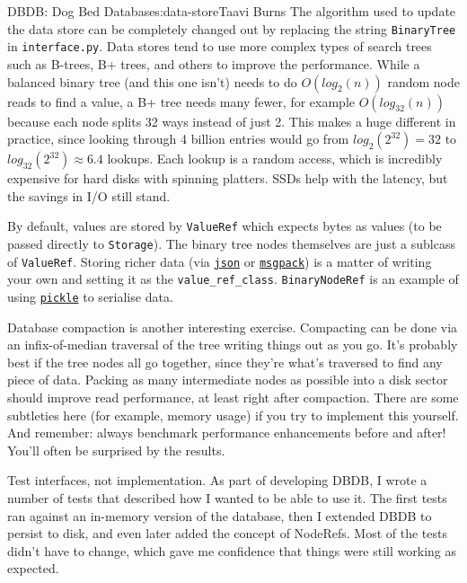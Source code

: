 \begin{aosachapter}{DBDB: Dog Bed Database}{s:data-store}{Taavi Burns}
The algorithm used to update the data store can be completely changed
out by replacing the string \texttt{BinaryTree} in
\texttt{interface.py}. Data stores tend to use more complex types of
search trees such as B-trees, B+ trees, and others to improve the
performance. While a balanced binary tree (and this one isn't) needs to
do $O(log_2(n))$ random node reads to find a value, a B+ tree needs many
fewer, for example $O(log_{32}(n))$ because each node splits 32 ways
instead of just 2. This makes a huge different in practice, since
looking through 4 billion entries would go from $log_2(2^{32}) = 32$ to
$log_{32}(2^{32}) \approx 6.4$ lookups. Each lookup is a random access,
which is incredibly expensive for hard disks with spinning platters.
SSDs help with the latency, but the savings in I/O still stand.

By default, values are stored by \texttt{ValueRef} which expects bytes
as values (to be passed directly to \texttt{Storage}). The binary tree
nodes themselves are just a sublcass of \texttt{ValueRef}. Storing
richer data (via \href{http://json.org}{\texttt{json}} or
\href{http://msgpack.org}{\texttt{msgpack}}) is a matter of writing your
own and setting it as the \texttt{value\_ref\_class}.
\texttt{BinaryNodeRef} is an example of using
\href{https://docs.python.org/3.4/library/pickle.html}{\texttt{pickle}}
to serialise data.

Database compaction is another interesting exercise. Compacting can be
done via an infix-of-median traversal of the tree writing things out as
you go. It's probably best if the tree nodes all go together, since
they're what's traversed to find any piece of data. Packing as many
intermediate nodes as possible into a disk sector should improve read
performance, at least right after compaction. There are some subtleties
here (for example, memory usage) if you try to implement this yourself.
And remember: always benchmark performance enhancements before and
after! You'll often be surprised by the results.

\label{patterns-and-principles}

Test interfaces, not implementation. As part of developing DBDB, I wrote
a number of tests that described how I wanted to be able to use it. The
first tests ran against an in-memory version of the database, then I
extended DBDB to persist to disk, and even later added the concept of
NodeRefs. Most of the tests didn't have to change, which gave me
confidence that things were still working as expected.


\end{aosachapter}
